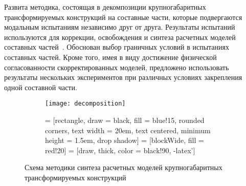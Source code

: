 Развита методика, состоящая в декомпозиции крупногабаритных трансформируемых конструкций на составные части, которые подвергаются модальным испытаниям независимо друг от друга. Результаты испытаний используются для коррекции, освобождения и синтеза расчетных моделей составных частей~. Обоснован выбор граничных условий в испытаниях составных частей. Кроме того, имея в виду достижение физической согласованности скорректированных моделей, предложено использовать результаты нескольких экспериментов при различных условиях закрепления одной составной части.

\begin{figure}[!htb]
	\centering
	\begin{subfigure}[b]{0.45\textwidth}
		\texttt{[image: decomposition]}
	\end{subfigure}
	\hfill
	\begin{subfigure}[b]{0.45\textwidth}
         = [rectangle, draw = black, fill = blue!15, rounded corners, text width = 20em, text centered, minimum height = 1.5em, drop shadow] 
         = [blockWide, fill = red!20]
         = [draw, thick, color = black!90, -latex'] 
        \scriptsize 
        \def\nodeDist{0.3cm}
	\end{subfigure}
    \caption{Схема методики синтеза расчетных моделей крупногабаритных трансформируемых конструкций} \label{fig:schemeDecomposition}
    \vspace{1em}
\end{figure}  

